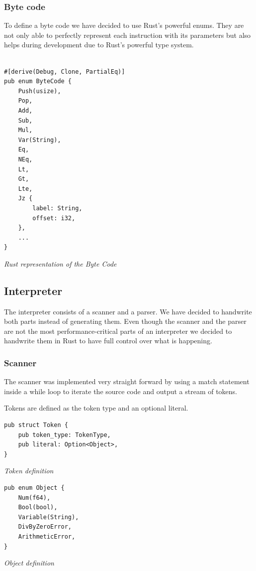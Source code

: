 \documentclass{article}
\begin{document}
\subsubsection{Byte code}
\label{sec:byte_code}

To define a byte code we have decided to use Rust's powerful enums. They are
not only able to perfectly represent each instruction with its parameters but
also helps during development due to Rust's powerful type system.

\begin{verbatim}

#[derive(Debug, Clone, PartialEq)]
pub enum ByteCode {
    Push(usize),
    Pop,
    Add,
    Sub,
    Mul,
    Var(String),
    Eq,
    NEq,
    Lt,
    Gt,
    Lte,
    Jz {
        label: String,
        offset: i32,
    },
    ...
}

\end{verbatim}
\textit{Rust representation of the Byte Code} \\

\subsection{Interpreter}
The interpreter consists of a scanner and a parser. We have decided to
handwrite both parts instead of generating them. Even though the scanner and
the parser are not the most performance-critical parts of an interpreter we
decided to handwrite them in Rust to have full control over what is happening.

\subsubsection{Scanner}
The scanner was implemented very straight forward by using a match statement
inside a while loop to iterate the source code and output a stream of tokens.

Tokens are defined as the token type and an optional literal.

\begin{verbatim}
pub struct Token {
    pub token_type: TokenType,
    pub literal: Option<Object>,
}
\end{verbatim}
\textit{Token definition}

\begin{verbatim}
pub enum Object {
    Num(f64),
    Bool(bool),
    Variable(String),
    DivByZeroError,
    ArithmeticError,
}
\end{verbatim}
\textit{Object definition}
\end{document}
